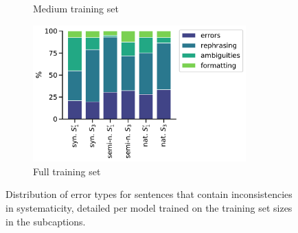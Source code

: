 \begin{figure}[h]
\begin{subfigure}[b]{0.25\textwidth}
\caption{Medium training set}
\end{subfigure}
\begin{subfigure}[b]{0.41\textwidth}
\includegraphics[width=0.9\textwidth]{figures/analysis_appendix/systematicity_full.pdf}
\caption{Full training set}
\end{subfigure}
\caption{Distribution of error types for sentences that contain inconsistencies in systematicity, detailed per model trained on the training set sizes in the subcaptions.}
\label{fig:ap_systematicity_analysis}
\end{figure}
